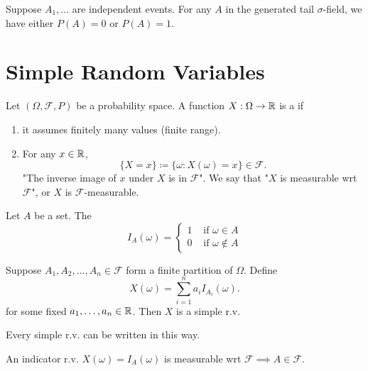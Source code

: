 \documentclass[class=article,crop=false]{standalone}
\begin{document}
\begin{thm}
	Suppose $ A_1,\ldots$ are independent events. For any $ A$ in the generated tail  $\sigma$-field, we have either $ P(A) =0$ or  $ P(A)=1$.
\end{thm}
\section{Simple Random Variables}
\begin{defn}
Let $ (\Omega,\mathcal{F},P)$ be a probability space. A function $ X:\Omega \to \mathbb{R}$ is a  if 
	\begin{enumerate}[label=(\roman*)]
		\item it assumes finitely many values (finite range).
		\item For any $ x \in \mathbb{R}$, 
			\[
				\{X=x\}\coloneqq \{\omega: X(\omega)=x\} \in \mathcal{F}  
			.\]
			"The inverse image of $ x$ under  $ X$ is in  $ \mathcal{F}$". We say that "$ X$ is measurable wrt  $ \mathcal{F}$", or $ X$ is $ \mathcal{F}$-measurable.
	\end{enumerate}
\end{defn}

\begin{defn}
	Let $ A$ be a set. The 
\begin{equation*}
	I_A(\omega)=
\begin{cases}
	1 &\text{ if } \omega \in A\\
	0 & \text{ if } \omega \not\in A 
\end{cases}
\end{equation*}
\end{defn}

\begin{thm}
Suppose $ A_1,A_2,\ldots,A_n \in \mathcal{F}$ form a finite partition of $ \Omega$. Define
\[
	X(\omega)=\sum_{ i= 1}^{ n} a_i I_{A_i} (\omega)
.\] 
for some fixed $ a_1,\ldots,a_n \in \mathbb{R}$. Then $ X$ is a simple r.v.
\end{thm}
\begin{note}[]
Every simple r.v. can be written in this way.
\end{note}

\begin{thm}[]
	An indicator r.v. $ X(\omega) = I_A(\omega)$ is measurable wrt $ \mathcal{F} \implies A \in \mathcal{F}$.
\end{thm}
\end{document}
